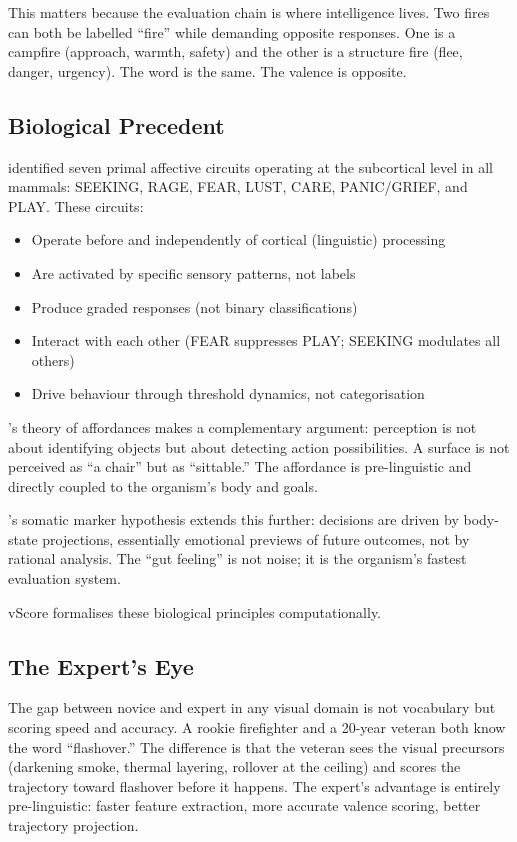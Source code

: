 \documentclass[11pt]{article}
\begin{document}
This matters because the evaluation chain is where intelligence lives. Two fires can both be labelled ``fire'' while demanding opposite responses. One is a campfire (approach, warmth, safety) and the other is a structure fire (flee, danger, urgency). The word is the same. The valence is opposite.

\subsection{Biological Precedent}

\citet{panksepp1998} identified seven primal affective circuits operating at the subcortical level in all mammals: SEEKING, RAGE, FEAR, LUST, CARE, PANIC/GRIEF, and PLAY. These circuits:

\begin{itemize}
    \item Operate before and independently of cortical (linguistic) processing
    \item Are activated by specific sensory patterns, not labels
    \item Produce graded responses (not binary classifications)
    \item Interact with each other (FEAR suppresses PLAY; SEEKING modulates all others)
    \item Drive behaviour through threshold dynamics, not categorisation
\end{itemize}

\citeauthor{gibson1979}'s \citeyearpar{gibson1979} theory of affordances makes a complementary argument: perception is not about identifying objects but about detecting action possibilities. A surface is not perceived as ``a chair'' but as ``sittable.'' The affordance is pre-linguistic and directly coupled to the organism's body and goals.

\citeauthor{damasio1994}'s \citeyearpar{damasio1994} somatic marker hypothesis extends this further: decisions are driven by body-state projections, essentially emotional previews of future outcomes, not by rational analysis. The ``gut feeling'' is not noise; it is the organism's fastest evaluation system.

vScore formalises these biological principles computationally.

\subsection{The Expert's Eye}

The gap between novice and expert in any visual domain is not vocabulary but scoring speed and accuracy. A rookie firefighter and a 20-year veteran both know the word ``flashover.'' The difference is that the veteran sees the visual precursors (darkening smoke, thermal layering, rollover at the ceiling) and scores the trajectory toward flashover before it happens. The expert's advantage is entirely pre-linguistic: faster feature extraction, more accurate valence scoring, better trajectory projection.
\end{document}
